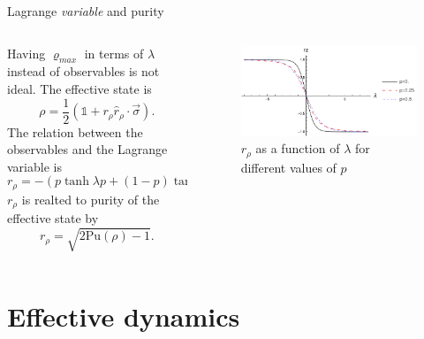 \documentclass{cubeamer}
\newcommand{\Id}{\mathds{1}}%
\begin{document}
\begin{frame}{Lagrange \textit{variable} and purity}
    \begin{columns}
        \begin{column}{0.5\textwidth}
            Having $\varrho_{max}$ in terms of $\lambda$ instead of observables is not ideal. The effective state is
            \begin{equation*}
                \rho=\frac{1}{2}(\Id+r_{\rho}\hat{r}_{\rho}\cdot\vec{\sigma}).
            \end{equation*}
            The relation between the observables and the Lagrange variable is
            \begin{equation*}
                r_{\rho}=-(p\tanh{\lambda p}+(1-p)\tanh{\lambda (1-p)}).
            \end{equation*}
            $r_{\rho}$ is realted to purity of the effective state by
            \begin{equation*}
                r_{\rho}=\sqrt{2\text{Pu}(\rho)-1}.
            \end{equation*}
        \end{column}
        \begin{column}{0.5\textwidth}
            \begin{figure}[h!]
                \includegraphics[width=0.8\columnwidth]{../notes/log/maxent/figures/rz(lambda)_lambda-8to8.png}%
                \caption{$r_{\rho}$ as a function of $\lambda$ for different values of $p$}
            \end{figure}
        \end{column}
    \end{columns}
\end{frame}

\section{Effective dynamics}
\end{document}

